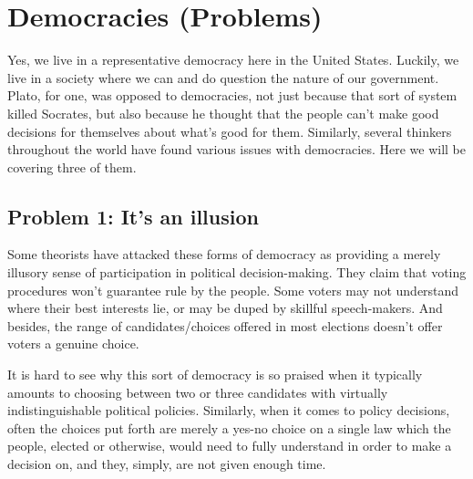 \section{Democracies (Problems)}

Yes, we live in a representative democracy here in the United States. Luckily, we live in a society where we can and do question the nature of our government. Plato, for one, was opposed to democracies, not just because that sort of system killed Socrates, but also because he thought that the people can't make good decisions for themselves about what's good for them. Similarly, several thinkers throughout the world have found various issues with democracies. Here we will be covering three of them.
\subsection{Problem 1: It’s an illusion}

Some theorists have attacked these forms of democracy as providing a merely illusory sense of participation in political decision-making. They claim that voting procedures won’t guarantee rule by the people. Some voters may not understand where their best interests lie, or may be duped by skillful speech-makers. And besides, the range of candidates/choices offered in most elections doesn’t offer voters a genuine choice.


It is hard to see why this sort of democracy is so praised when it typically amounts to choosing between two or three candidates with virtually indistinguishable political policies. Similarly, when it comes to policy decisions, often the choices put forth are merely a yes-no choice on a single law which the people, elected or otherwise, would need to fully understand in order to make a decision on, and they, simply, are not given enough time. 
 
